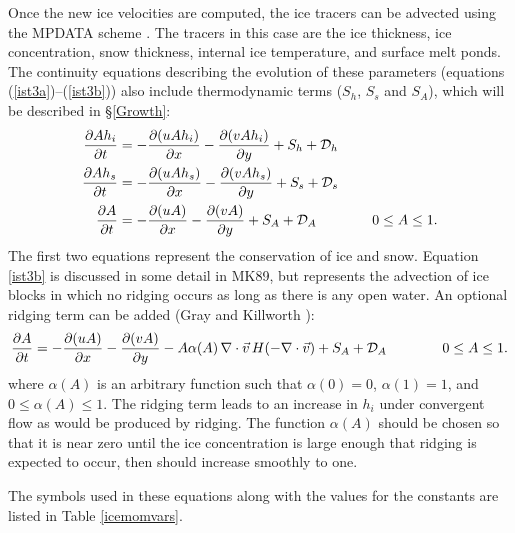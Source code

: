 Once the new ice velocities are computed, the ice tracers can be
advected using the MPDATA scheme \cite{Smolark90}. The tracers in
this case are the ice thickness, ice concentration, snow thickness,
internal ice temperature, and surface melt ponds. The continuity
equations describing the evolution of these parameters (equations
(\ref{ist3a})--(\ref{ist3b})) also include thermodynamic terms ($S_h$,
$S_s$ and $S_A$), which will be described in \S\ref{Growth}:
\begin{align}
  \frac{\partial A h_i }{ \partial t} & =
  - \frac{\partial (u A h_i) }{ \partial x} -
  \frac{\partial (v A h_i) }{ \partial y}
  + S_h + {\cal D}_h
\label{ist3a} \\
  \frac{\partial A h_s }{ \partial t} & =
  - \frac{\partial (u A h_s) }{ \partial x} -
  \frac{\partial (v A h_s) }{ \partial y}
  + S_s + {\cal D}_s
\label{ist3c} \\
  \frac{\partial A }{ \partial t} & =
  - \frac{\partial (uA) }{ \partial x} - \frac{\partial (vA) }{ \partial y}
  + S_A + {\cal D}_A \qquad \qquad 0 \leq A \leq 1 .
\label{ist3b}
\end{align}
The first two equations represent the conservation of ice and snow.
Equation \ref{ist3b} is discussed in some detail in MK89, but
represents the advection of ice blocks in which no ridging occurs as
long as there is any open water. An optional ridging term can be added
(Gray and Killworth \cite{Gray96}):
\begin{equation}
  \frac{\partial A }{ \partial t} =
  - \frac{\partial (uA) }{ \partial x} - \frac{\partial (vA) }{ \partial y}
  - A \alpha(A) \, \nabla \cdot \vec{v} \, H(-\nabla \cdot \vec{v})
  + S_A + {\cal D}_A \qquad \qquad 0 \leq A \leq 1 .
\end{equation}
where $\alpha(A)$ is an arbitrary function such that $\alpha(0) = 0$,
$\alpha(1) = 1$, and $0 \leq \alpha(A) \leq 1$. The ridging term leads
to an increase in $h_i$ under convergent flow as would be produced by
ridging. The function $\alpha(A)$ should be chosen so that it is near
zero until the ice concentration is large enough that ridging is
expected to occur, then should increase smoothly to one.

The symbols used in these equations along with the values for the
constants are listed in Table \ref{icemomvars}.

